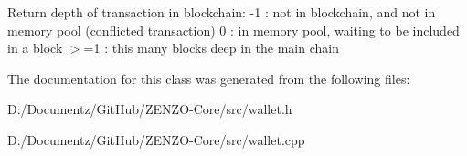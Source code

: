 Return depth of transaction in blockchain\+: -\/1 \+: not in blockchain, and not in memory pool (conflicted transaction) 0 \+: in memory pool, waiting to be included in a block $>$=1 \+: this many blocks deep in the main chain 

The documentation for this class was generated from the following files\+:\begin{DoxyCompactItemize}
\item 
D\+:/\+Documentz/\+Git\+Hub/\+Z\+E\+N\+Z\+O-\/\+Core/src/wallet.\+h\item 
D\+:/\+Documentz/\+Git\+Hub/\+Z\+E\+N\+Z\+O-\/\+Core/src/wallet.\+cpp\end{DoxyCompactItemize}
